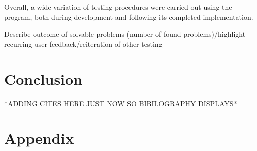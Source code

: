 \documentclass{l3proj}
\begin{document}
Overall, a wide variation of testing procedures were carried out using the program, both during development and following its completed implementation.

Describe outcome of solvable problems (number of found problems)/highlight recurring user feedback/reiteration of other testing

\chapter{Conclusion}
\label{conclusion}

*ADDING CITES HERE JUST NOW SO BIBILOGRAPHY DISPLAYS*
\cite{2DAPI,Swing,Graphics,BeginnerGo,GoProbs,AI,MCG, Tromp_2006}




\chapter{Appendix}
\label{appendix}


\end{document}
